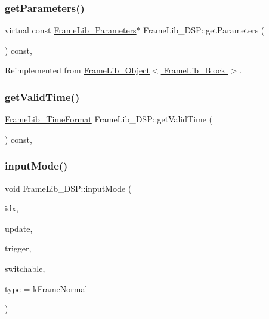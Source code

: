 \subsubsection{\texorpdfstring{get\+Parameters()}{getParameters()}}
{\footnotesize\ttfamily virtual const \hyperlink{class_frame_lib___parameters}{Frame\+Lib\+\_\+\+Parameters}$\ast$ Frame\+Lib\+\_\+\+D\+S\+P\+::get\+Parameters (\begin{DoxyParamCaption}{ }\end{DoxyParamCaption}) const\hspace{0.3cm}{\ttfamily [inline]}, {\ttfamily [virtual]}}



Reimplemented from \hyperlink{class_frame_lib___object_ac90a6770aeef26ee1601889dc16dba56}{Frame\+Lib\+\_\+\+Object$<$ Frame\+Lib\+\_\+\+Block $>$}.

\mbox{\label{class_frame_lib___d_s_p_afa420e10b7ea7a300bf106631167cac0}} 
\subsubsection{\texorpdfstring{get\+Valid\+Time()}{getValidTime()}}
{\footnotesize\ttfamily \hyperlink{_frame_lib___types_8h_a699a4071a9eaaa283906a5ebd0a79ac0}{Frame\+Lib\+\_\+\+Time\+Format} Frame\+Lib\+\_\+\+D\+S\+P\+::get\+Valid\+Time (\begin{DoxyParamCaption}{ }\end{DoxyParamCaption}) const\hspace{0.3cm}{\ttfamily [inline]}, {\ttfamily [protected]}}

\mbox{\label{class_frame_lib___d_s_p_af9c0571cc8f82bb560be0f0cfcd73d78}} 
\subsubsection{\texorpdfstring{input\+Mode()}{inputMode()}}
{\footnotesize\ttfamily void Frame\+Lib\+\_\+\+D\+S\+P\+::input\+Mode (\begin{DoxyParamCaption}\item[{unsigned long}]{idx,  }\item[{bool}]{update,  }\item[{bool}]{trigger,  }\item[{bool}]{switchable,  }\item[{\hyperlink{_frame_lib___types_8h_ad495a9f61af7fff07d7e97979d1ab854}{Frame\+Type}}]{type = {\ttfamily \hyperlink{_frame_lib___types_8h_ad495a9f61af7fff07d7e97979d1ab854a4bc2388cbdd721f5039a32f95cd92b03}{k\+Frame\+Normal}} }\end{DoxyParamCaption})\hspace{0.3cm}{\ttfamily [protected]}}

